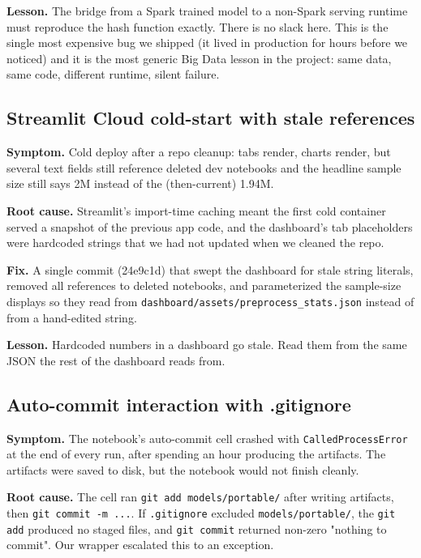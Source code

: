 \documentclass[11pt,letterpaper]{article}
\begin{document}
\textbf{Lesson.} The bridge from a Spark trained model to a non-Spark serving runtime must reproduce the hash function exactly. There is no slack here. This is the single most expensive bug we shipped (it lived in production for hours before we noticed) and it is the most generic Big Data lesson in the project: same data, same code, different runtime, silent failure.

\subsection{Streamlit Cloud cold-start with stale references}

\textbf{Symptom.} Cold deploy after a repo cleanup: tabs render, charts render, but several text fields still reference deleted dev notebooks and the headline sample size still says 2M instead of the (then-current) 1.94M.

\textbf{Root cause.} Streamlit's import-time caching meant the first cold container served a snapshot of the previous app code, and the dashboard's tab placeholders were hardcoded strings that we had not updated when we cleaned the repo.

\textbf{Fix.} A single commit (24e9c1d) that swept the dashboard for stale string literals, removed all references to deleted notebooks, and parameterized the sample-size displays so they read from \texttt{dashboard/assets/preprocess\_stats.json} instead of from a hand-edited string.

\textbf{Lesson.} Hardcoded numbers in a dashboard go stale. Read them from the same JSON the rest of the dashboard reads from.

\subsection{Auto-commit interaction with .gitignore}

\textbf{Symptom.} The notebook's auto-commit cell crashed with \texttt{CalledProcessError} at the end of every run, after spending an hour producing the artifacts. The artifacts were saved to disk, but the notebook would not finish cleanly.

\textbf{Root cause.} The cell ran \texttt{git add models/portable/} after writing artifacts, then \texttt{git commit -m ...}. If \texttt{.gitignore} excluded \texttt{models/portable/}, the \texttt{git add} produced no staged files, and \texttt{git commit} returned non-zero "nothing to commit". Our wrapper escalated this to an exception.
\end{document}
